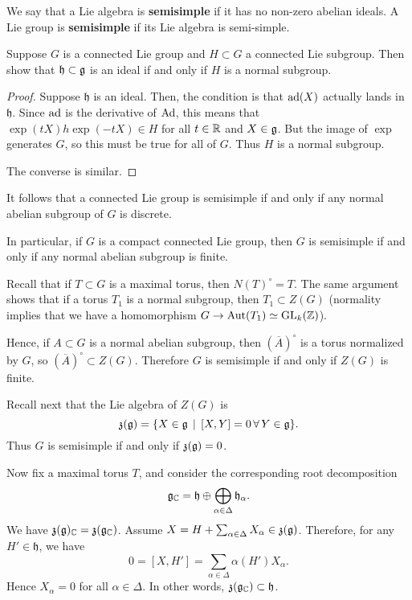 \documentclass[11pt, english]{article}
\begin{document}
We say that a Lie algebra is \textbf{semisimple} if it has no non-zero abelian ideals. A Lie group is \textbf{semisimple} if its Lie algebra is semi-simple.

\begin{lemma}
Suppose $G$ is a connected Lie group and $H \subset G$ a connected Lie subgroup. Then show that $\mathfrak h \subset \mathfrak g$ is an ideal if and only if $H$ is a normal subgroup.
\end{lemma}
\begin{proof}
Suppose $\mathfrak h$ is an ideal. Then, the condition is that $\operatorname{ad}(X)$ actually lands in $\mathfrak h$. Since $\operatorname{ad}$ is the derivative of $\operatorname{Ad}$, this means that $\exp(tX) h \exp(-tX) \in H$ for all $t \in \mathbb{R}$ and $X \in \mathfrak g$. But the image of $\exp$ generates $G$, so this must be true for all of $G$. Thus $H$ is a normal subgroup.

The converse is similar.
\end{proof}

It follows that a connected Lie group is semisimple if and only if any normal abelian subgroup of $G$ is discrete.

In particular, if $G$ is a compact connected Lie group, then $G$ is semisimple if and only if any normal abelian subgroup is finite.

Recall that if $T \subset G$ is a maximal torus, then $N(T)^\circ = T$. The same argument shows that if a torus $T_1$ is a normal subgroup, then $T_1 \subset Z(G)$ (normality implies that we have a homomorphism $G \to \operatorname{Aut}(T_1) \simeq \operatorname{GL}_k(\mathbb{Z})$). 

Hence, if $A \subset G$ is a normal abelian subgroup, then $(\overline A)^\circ$ is a torus normalized by $G$, so $(\overline A)^\circ \subset Z(G)$.  Therefore $G$ is semisimple if and only if $Z(G)$ is finite.

Recall next that the Lie algebra of $Z(G)$ is
$$
\mathfrak z(\mathfrak g) = \{ X \in \mathfrak g \, \mid \, [X,Y] = 0 \, \forall \, Y \in \mathfrak g \}.
$$
Thus $G$ is semisimple if and only if $\mathfrak z(\mathfrak g) = 0$.

Now fix a maximal torus $T$, and consider the corresponding root decomposition
$$
\mathfrak g_{\mathbb{C}} = \mathfrak h \oplus \bigoplus_{\alpha \in \Delta} \mathfrak h_\alpha.
$$
We have $\mathfrak z(\mathfrak g)_{\mathbb{C}} = \mathfrak z(\mathfrak g_{\mathbb{C}})$. Assume $X = H + \sum_{\alpha \in \Delta} X_\alpha \in \mathfrak z(\mathfrak g)$. Therefore, for any $H' \in \mathfrak h$, we have
$$
0 = [X,H'] = \sum_{\alpha\in \Delta} \alpha(H')X_\alpha.
$$
Hence $X_\alpha = 0$ for all $\alpha \in \Delta$. In other words, $\mathfrak z(\mathfrak g_{\mathbb{C}}) \subset \mathfrak h$.
\end{document}
